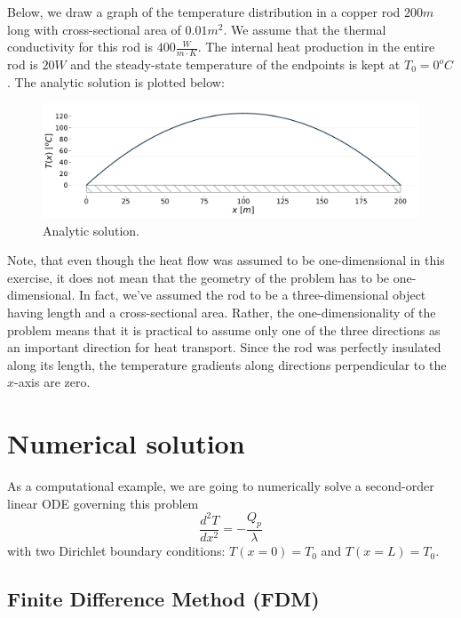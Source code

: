 Below, we draw a graph of the temperature distribution in a copper rod $200m$ long with cross-sectional area of $0.01m^2$. We assume that the thermal conductivity for this rod is $400 \frac{W}{m \cdot K}$. The internal heat production in the entire rod is $20 W$ and the steady-state temperature of the endpoints is kept at $T_0 = 0^o C$. The analytic solution is plotted below:
\begin{figure}[H]
\centering\includegraphics[width=12cm]{figures/example-heat-transfer-in-a-rod-analytic.pdf}
\caption{Analytic solution.}
\label{fig:analytic-solution}
\end{figure}

Note, that even though the heat flow was assumed to be one-dimensional in this exercise, it does not mean that the geometry of the problem has to be one-dimensional. In fact, we've assumed the rod to be a three-dimensional object having length and a cross-sectional area. Rather, the one-dimensionality of the problem means that it is practical to assume only one of the three directions as an important direction for heat transport. Since the rod was perfectly insulated along its length, the temperature gradients along directions perpendicular to the $x$-axis are zero.

\section{Numerical solution}

As a computational example, we are going to numerically solve a second-order linear ODE governing this problem
$$\frac{d^2 T}{dx^2} = - \frac{Q_p}{\lambda}$$
with two Dirichlet boundary conditions: $T(x=0) = T_0$ and $T(x=L) = T_0$.

\subsection{Finite Difference Method (FDM)}

